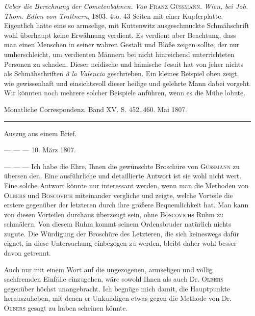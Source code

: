 \expandafter\def\csname HistoricalNoteText491\endcsname{\emph{Ueber die Berechnung der Cometenbahnen.} \emph{Von} \textsc{Franz Güssmann}. \emph{Wien, bei Joh. Thom. Edlen von Trattnern}, 1803. 4to. 43 Seiten mit einer Kupferplatte. Eigentlich hätte eine so armselige, mit Kuttenwitz ausgeschmückte Schmähschrift wohl überhaupt keine Erwähnung verdient. Es verdient aber Beachtung, dass man einen Menschen in seiner wahren Gestalt und Blöße zeigen sollte, der nur umherschleicht, um verdienten Männern bei nicht hinreichend unterrichteten Personen zu schaden. Dieser neidische und hämische Jesuit hat von jeher nichts als Schmähschriften \emph{à la Valencia} geschrieben. Ein kleines Beispiel oben zeigt, wie gewissenhaft und einsichtsvoll dieser heilige und gelehrte Mann dabei vorgeht. Wir könnten noch mehrere solcher Beispiele anführen, wenn es die Mühe lohnte.}
\clearpage
{}
\hypertarget{native-491-lower}{}\label{native-491-lower}
\begin{center}
\small Monatliche Correspondenz. Band XV. S. 452..460. Mai 1807.\\[3pt]
\rule{.72\linewidth}{.3pt}
\end{center}
\begin{center}Auszug aus einem Brief.\end{center}
\begin{flushright}--- --- --- 10. März 1807.\end{flushright}

--- --- --- Ich habe die Ehre, Ihnen die gewünschte Broschüre von \textsc{Güssmann} zu übersen%
%
den. Eine ausführliche und detaillierte Antwort ist sie wohl nicht wert. Eine solche Antwort könnte nur interessant werden, wenn man die Methoden von \textsc{Olbers} und \textsc{Boscovich} miteinander vergliche und zeigte, welche Vorteile die erstere gegenüber der letzteren durch ihre größere Bequemlichkeit hat. Man kann von diesen Vorteilen durchaus überzeugt sein, ohne \textsc{Boscovich}s Ruhm zu schmälern. Von diesem Ruhm kommt seinem Ordensbruder natürlich nichts zugute. Die Würdigung der Broschüre des Letzteren, die sich keineswegs dafür eignet, in diese Untersuchung einbezogen zu werden, bleibt daher wohl besser davon getrennt.

Auch nur mit einem Wort auf die ungezogenen, armseligen und völlig sachfremden Einfälle einzugehen, wäre sowohl Ihnen als auch Dr. \textsc{Olbers} gegenüber höchst unangebracht. Ich begnüge mich damit, die Hauptpunkte herauszuheben, mit denen er Unkundigen etwas gegen die Methode von Dr. \textsc{Olbers} gesagt zu haben scheinen könnte.

